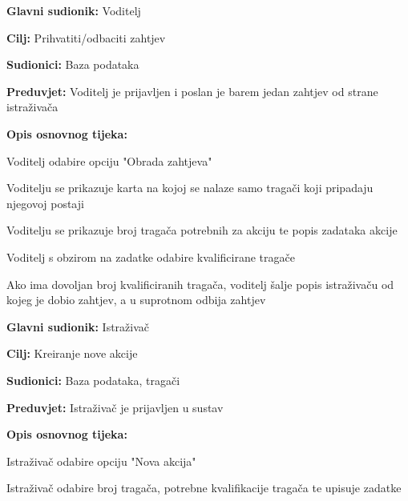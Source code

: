 					\noindent {}
					\begin{packed_item}
						
						\item \textbf{Glavni sudionik: } Voditelj
						\item  \textbf{Cilj:} Prihvatiti/odbaciti zahtjev
						\item  \textbf{Sudionici:} Baza podataka
						\item  \textbf{Preduvjet:} Voditelj je prijavljen i poslan je barem jedan zahtjev od strane istraživača
						\item  \textbf{Opis osnovnog tijeka:}
						
						\item[] \begin{packed_enum}						
							\item Voditelj odabire opciju "Obrada zahtjeva"
							\item Voditelju se prikazuje karta na kojoj se nalaze samo tragači koji pripadaju njegovoj postaji
							\item Voditelju se prikazuje broj tragača potrebnih za akciju te popis zadataka akcije
							\item Voditelj s obzirom na zadatke odabire kvalificirane tragače  
							\item Ako ima dovoljan broj kvalificiranih tragača, voditelj šalje popis istraživaču od kojeg je dobio zahtjev, a u suprotnom odbija zahtjev
						\end{packed_enum}
					\end{packed_item}
					
					\noindent \underbar{\textbf{UC19 - Kreiranje akcije}}
					\begin{packed_item}
						
						\item \textbf{Glavni sudionik: } Istraživač
						\item  \textbf{Cilj:} Kreiranje nove akcije
						\item  \textbf{Sudionici:} Baza podataka, tragači
						\item  \textbf{Preduvjet:} Istraživač je prijavljen u sustav
						\item  \textbf{Opis osnovnog tijeka:}
						
						\item[] \begin{packed_enum}
							
							\item Istraživač odabire opciju "Nova akcija"
							\item Istraživač odabire broj tragača, potrebne kvalifikacije tragača te upisuje zadatke
						\end{packed_enum}
					\end{packed_item}
					
